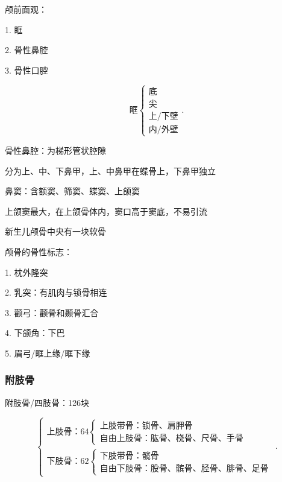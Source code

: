 \begin{notation}
    颅前面观：

    1. 眶

    2. 骨性鼻腔

    3. 骨性口腔
\end{notation}
\[
    \text{眶}
    \begin{cases}
        \text{底}\\ 
        \text{尖}\\ 
        \text{上/下壁}\\ 
        \text{内/外壁}
    \end{cases}
.\] 

\begin{notation}
    骨性鼻腔：为梯形管状腔隙

    分为上、中、下鼻甲，上、中鼻甲在蝶骨上，下鼻甲独立
\end{notation}
\begin{notation}
    鼻窦：含额窦、筛窦、蝶窦、上颌窦

    上颌窦最大，在上颌骨体内，窦口高于窦底，不易引流
\end{notation}
\begin{notation}
    新生儿颅骨中央有一块软骨
\end{notation}
颅骨的骨性标志：

1. 枕外隆突

2. 乳突：有肌肉与锁骨相连

3. 颧弓：颧骨和颞骨汇合

4. 下颌角：下巴

5. 眉弓/眶上缘/眶下缘
\subsubsection{附肢骨}%
\label{subsub:附肢骨}
附肢骨/四肢骨：126块

\[
    \begin{cases}
        \text{上肢骨：64}
        \begin{cases}
            \text{上肢带骨：锁骨、肩胛骨}\\ 
            \text{自由上肢骨：肱骨、桡骨、尺骨、手骨}
        \end{cases}\\
        \text{下肢骨：62}\begin{cases}
            \text{下肢带骨：髋骨}\\ 
            \text{自由下肢骨：股骨、髌骨、胫骨、腓骨、足骨}
        \end{cases}
    \end{cases}
.\] 
